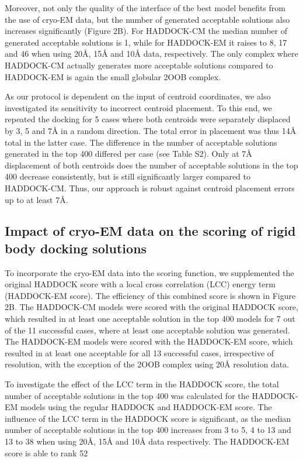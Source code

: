 Moreover, not only the quality of the interface of the best model benefits from the use of cryo-EM data, but the number of generated acceptable solutions also increases significantly (Figure 2B). 
For HADDOCK-CM the median number of generated acceptable solutions is 1, while for HADDOCK-EM it raises to 8, 17 and 46 when using 20Å, 15Å and 10Å data, respectively. 
The only complex where HADDOCK-CM actually generates more acceptable solutions compared to HADDOCK-EM is again the small globular 2OOB complex.

As our protocol is dependent on the input of centroid coordinates, we also investigated its sensitivity to incorrect centroid placement. 
To this end, we repeated the docking for 5 cases where both centroids were separately displaced by 3, 5 and 7Å in a random direction. 
The total error in placement was thus 14Å total in the latter case. The difference in the number of acceptable solutions generated in the top 400 differed per case (see Table S2). 
Only at 7Å displacement of both centroids does the number of acceptable solutions in the top 400 decrease consistently, but is still significantly larger compared to HADDOCK-CM. 
Thus, our approach is robust against centroid placement errors up to at least 7Å.

\subsection{Impact of cryo-EM data on the scoring of rigid body docking solutions}

To incorporate the cryo-EM data into the scoring function, we supplemented the original HADDOCK score with a local cross correlation (LCC) energy term (HADDOCK-EM score). 
The efficiency of this combined score is shown in Figure 2B. 
The HADDOCK-CM models were scored with the original HADDOCK score, which resulted in at least one acceptable solution in the top 400 models for 7 out of the 11 successful cases, where at least one acceptable solution was generated. 
The HADDOCK-EM models were scored with the HADDOCK-EM score, which resulted in at least one acceptable for all 13 successful cases, irrespective of resolution, with the exception of the 2OOB complex using 20Å resolution data. 

To investigate the effect of the LCC term in the HADDOCK score, the total number of acceptable solutions in the top 400 was calculated for the HADDOCK-EM models using the regular HADDOCK and HADDOCK-EM score. 
The influence of the LCC term in the HADDOCK score is significant, as the median number of acceptable solutions in the top 400 increases from 3 to 5, 4 to 13 and 13 to 38 when using 20Å, 15Å and 10Å data respectively. 
The HADDOCK-EM score is able to rank 52%

